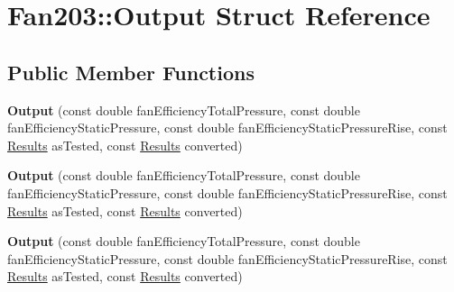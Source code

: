 \hypertarget{struct_fan203_1_1_output}{}\section{Fan203\+:\+:Output Struct Reference}
\label{struct_fan203_1_1_output}
\subsection*{Public Member Functions}
\begin{DoxyCompactItemize}
\item 
\mbox{\label{struct_fan203_1_1_output_abe97e6fa71bba10b78bb6446390ef57e}} 
{\bfseries Output} (const double fan\+Efficiency\+Total\+Pressure, const double fan\+Efficiency\+Static\+Pressure, const double fan\+Efficiency\+Static\+Pressure\+Rise, const \hyperlink{struct_fan203_1_1_results}{Results} as\+Tested, const \hyperlink{struct_fan203_1_1_results}{Results} converted)
\item 
\mbox{\label{struct_fan203_1_1_output_abe97e6fa71bba10b78bb6446390ef57e}} 
{\bfseries Output} (const double fan\+Efficiency\+Total\+Pressure, const double fan\+Efficiency\+Static\+Pressure, const double fan\+Efficiency\+Static\+Pressure\+Rise, const \hyperlink{struct_fan203_1_1_results}{Results} as\+Tested, const \hyperlink{struct_fan203_1_1_results}{Results} converted)
\item 
\mbox{\label{struct_fan203_1_1_output_abe97e6fa71bba10b78bb6446390ef57e}} 
{\bfseries Output} (const double fan\+Efficiency\+Total\+Pressure, const double fan\+Efficiency\+Static\+Pressure, const double fan\+Efficiency\+Static\+Pressure\+Rise, const \hyperlink{struct_fan203_1_1_results}{Results} as\+Tested, const \hyperlink{struct_fan203_1_1_results}{Results} converted)
\end{DoxyCompactItemize}
